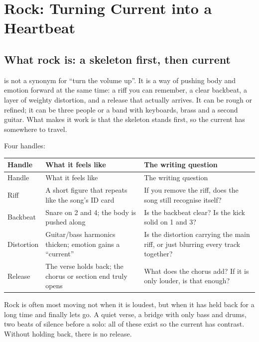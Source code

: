 \chapter{Rock: Turning Current into a Heartbeat}
\label{ch:genre-rock-deep}


\section{What rock is: a skeleton first, then current}
\label{sec:rock-what}

 is not a synonym for ``turn the volume up''. It is a way of pushing body and emotion forward at the same time: a riff you can remember, a clear backbeat, a layer of weighty distortion, and a release that actually arrives. It can be rough or refined; it can be three people or a band with keyboards, brass and a second guitar. What makes it work is that the skeleton stands first, so the current has somewhere to travel.

Four handles:

\begin{longtable}{p{}p{}p{}}
\toprule
Handle & What it feels like & The writing question \\
\midrule
\endfirsthead
\toprule
Handle & What it feels like & The writing question \\
\midrule
\endhead
Riff & A short figure that repeats like the song's ID card & If you remove the riff, does the song still recognise itself? \\
Backbeat & Snare on 2 and 4; the body is pushed along & Is the backbeat clear? Is the kick solid on 1 and 3? \\
Distortion & Guitar/bass harmonics thicken; emotion gains a ``current'' & Is the distortion carrying the main riff, or just blurring every track together? \\
Release & The verse holds back; the chorus or section end truly opens & What does the chorus add? If it is only louder, is that enough? \\
\bottomrule
\end{longtable}

Rock is often most moving not when it is loudest, but when it has held back for a long time and finally lets go. A quiet verse, a bridge with only bass and drums, two beats of silence before a solo: all of these exist so the current has contrast. Without holding back, there is no release.


